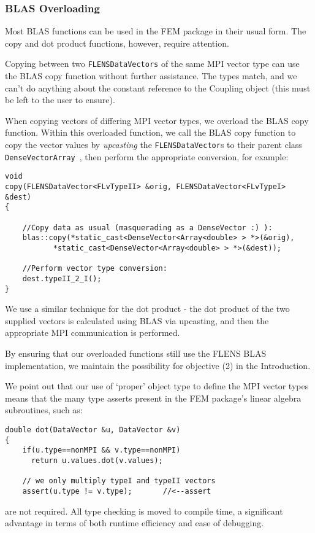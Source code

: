 \subsubsection{BLAS Overloading}

Most BLAS functions can be used in the FEM package in their usual form. The copy and dot product functions, however, require attention.

Copying between two \texttt{FLENSDataVectors} of the same MPI vector type can use the BLAS copy function without further assistance. The types match, and we can't do anything about the constant reference to the Coupling object (this must be left to the user to ensure). 

When copying vectors of differing MPI vector types, we overload the BLAS copy function. Within this overloaded function, we call the BLAS copy function to copy the vector values by \emph{upcasting} the \texttt{FLENSDataVector}s to their parent class \texttt{DenseVector\<Array\<\double\> \>}, then perform the appropriate conversion, for example:
\begin{lstlisting}
void
copy(FLENSDataVector<FLvTypeII> &orig, FLENSDataVector<FLvTypeI> &dest) 
{

	//Copy data as usual (masquerading as a DenseVector :) ):
	blas::copy(*static_cast<DenseVector<Array<double> > *>(&orig),
		   *static_cast<DenseVector<Array<double> > *>(&dest));

	//Perform vector type conversion:
	dest.typeII_2_I();
}
\end{lstlisting}

We use a similar technique for the dot product - the dot product of the two supplied vectors is calculated using BLAS via upcasting, and then the appropriate MPI communication is performed.

By ensuring that our overloaded functions still use the FLENS BLAS implementation, we maintain the possibility for objective (2) in the Introduction.

We point out that our use of `proper' object type to define the MPI vector types means that the many type asserts present in the FEM package's linear algebra subroutines, such as:
\begin{lstlisting}
double dot(DataVector &u, DataVector &v)
{
	if(u.type==nonMPI && v.type==nonMPI) 
	  return u.values.dot(v.values);
	
	// we only multiply typeI and typeII vectors
	assert(u.type != v.type);		//<--assert
\end{lstlisting}
are not required. All type checking is moved to compile time, a significant advantage in terms of both runtime efficiency and ease of debugging.

